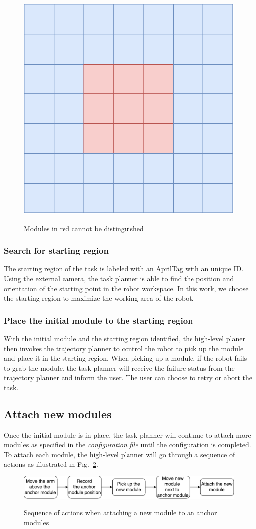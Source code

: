 \begin{figure}[ht!]%
\centering
{\includegraphics[width=0.3\columnwidth]{pics/moduleloop2.pdf}}
\caption{Modules in red cannot be distinguished}
\label{fig:loop2}
\end{figure}

\subsubsection{Search for starting region}
The starting region of the task is labeled with an AprilTag with an unique ID. Using the external camera, the task planner is able to find the position and orientation of the starting point in the robot workspace. In this work, we choose the starting region to maximize the working area of the robot.

\subsubsection{Place the initial module to the starting region}
With the initial module and the starting region identified, the high-level planer then invokes the trajectory planner to control the robot to pick up the module and place it in the starting region.
When picking up a module, if the robot fails to grab the module, the task planner will receive the failure status from the trajectory planner and inform the user. The user can choose to retry or abort the task.

\subsection{Attach new modules}
Once the initial module is in place, the task planner will continue to attach more modules as specified in the {\it configuration file} until the configuration is completed. To attach each module, the high-level planner will go through a sequence of actions as illustrated in Fig.~\ref{fig:attach}.

\begin{figure}[ht!]%
\centering
{\includegraphics[width=0.95\columnwidth]{pics/attach.pdf}}
\caption{Sequence of actions when attaching a new module to an anchor modules}
\label{fig:attach}
\end{figure}

